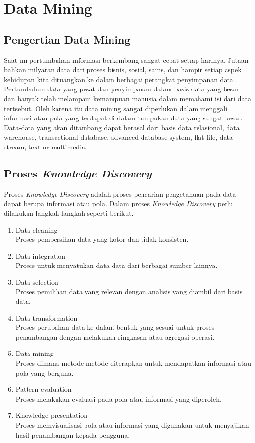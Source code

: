 \section{Data Mining}
\label{sec:data_mining}
\subsection{Pengertian Data Mining}
Saat ini pertumbuhan informasi berkembang sangat cepat setiap harinya. Jutaan bahkan milyaran data dari proses bisnis, sosial, sains, dan hampir setiap aspek kehidupan kita dituangkan ke dalam berbagai perangkat penyimpanan data. Pertumbuhan data yang pesat dan penyimpanan dalam basis data yang besar dan banyak telah melampaui kemampuan manusia dalam memahami isi dari data tertsebut. Oleh karena itu data mining sangat diperlukan dalam menggali informasi atau pola yang terdapat di dalam tumpukan data yang sangat besar. Data-data yang akan ditambang dapat berasal dari basis data relasional, data warehouse, transactional database, advanced database system, flat file, data stream, text or multimedia. \cite{han2011data} 

\subsection{Proses \textit{Knowledge Discovery}}
Proses \textit{Knowledge Discovery} adalah proses pencarian pengetahuan pada data dapat berupa informasi atau pola. Dalam proses \textit{Knowledge Discovery} perlu dilakukan langkah-langkah seperti berikut.

\begin{enumerate}
	\item Data cleaning \\Proses pembersihan data yang kotor dan tidak konsisten.
	\item Data integration \\Proses untuk menyatukan data-data dari berbagai sumber lainnya.
	\item Data selection \\Proses pemilihan data yang relevan dengan analisis yang diambil dari basis data.
	\item Data transformation \\Proses perubahan data ke dalam bentuk yang sesuai untuk proses penambangan dengan melakukan ringkasan atau agregasi operasi.
	\item Data mining \\Proses dimana metode-metode diterapkan untuk mendapatkan informasi atau pola yang berguna.
	\item Pattern evaluation \\Proses melakukan evaluasi pada pola atau informasi yang diperoleh.
	\item Knowledge presentation \\Proses memvisualisasi pola atau informasi yang digunakan untuk menyajikan hasil penambangan kepada pengguna.
\end{enumerate}


